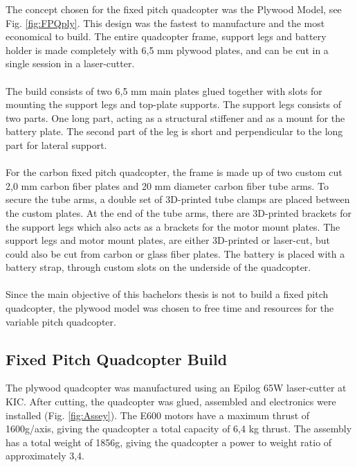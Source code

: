 \noindent
The concept chosen for the fixed pitch quadcopter was the Plywood Model, see Fig. \ref{fig:FPQply}. This design was the fastest to manufacture and the most economical to build. The entire quadcopter frame, support legs and battery holder is made completely with 6,5 mm plywood plates, and can be cut in a single session in a laser-cutter. 
\\\\
The build consists of two 6,5 mm main plates glued together with slots for mounting the support legs and top-plate supports. The support legs consists of two parts. One long part, acting as a structural stiffener and as a mount for the battery plate. The second part of the leg is short and perpendicular to the long part for lateral support.
\\\\
For the carbon fixed pitch quadcopter, the frame is made up of two custom cut 2,0 mm carbon fiber plates and 20 mm diameter carbon fiber tube arms. To secure the tube arms, a double set of 3D-printed tube clamps are placed between the custom plates. At the end of the tube arms, there are 3D-printed brackets for the support legs which also acts as a brackets for the motor mount plates. The support legs and motor mount plates, are either 3D-printed or laser-cut, but could also be cut from carbon or glass fiber plates. The battery is placed with a battery strap, through custom slots on the underside of the quadcopter.
\\\\
Since the main objective of this bachelors thesis is not to build a fixed pitch quadcopter, the plywood model was chosen to free time and resources for the variable pitch quadcopter.

\subsection{Fixed Pitch Quadcopter Build}

The plywood quadcopter was manufactured using an Epilog 65W laser-cutter at KIC. After cutting, the quadcopter was glued, assembled and electronics were installed (Fig. \ref{fig:Assey}). The E600 motors have a maximum thrust of 1600g/axis, giving the quadcopter a total capacity of 6,4 kg thrust. The assembly has a total weight of 1856g, giving the quadcopter a power to weight ratio of approximately 3,4.

